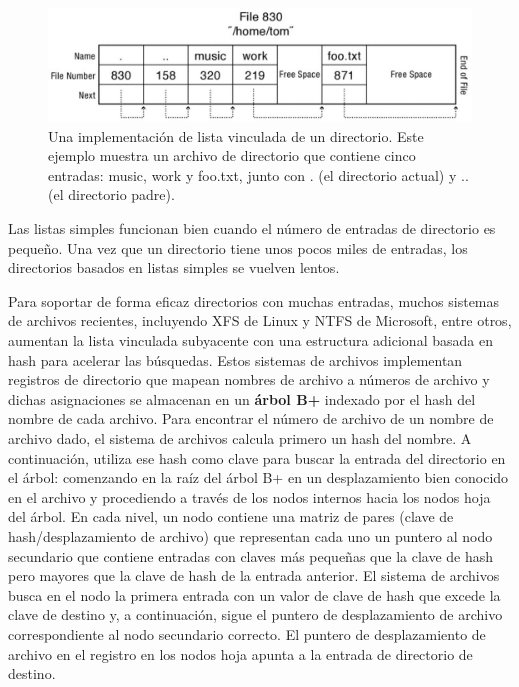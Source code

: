 \documentclass[10pt]{book}
\begin{document}
\begin{figure}[tbhp]
\centerline{\includegraphics[scale=0.50]{img/fig1304}}
\caption{Una implementación de lista vinculada de un directorio. Este ejemplo muestra un archivo de directorio que contiene cinco entradas: {\mf music}, {\mf work} y {\mf foo.txt}, junto con {\mf .} (el directorio actual) y {\mf ..} (el directorio padre).}
\label{fig1304}
\end{figure}

Las listas simples funcionan bien cuando el número de entradas de directorio es pequeño. Una vez que un directorio tiene unos pocos miles de entradas, los directorios basados en listas simples se vuelven lentos.

Para soportar de forma eficaz directorios con muchas entradas, muchos sistemas de archivos recientes, incluyendo XFS de Linux y NTFS de Microsoft, entre otros, aumentan la lista vinculada subyacente con una estructura adicional basada en hash para acelerar las búsquedas. Estos sistemas de archivos implementan registros de directorio que mapean nombres de archivo a números de archivo y dichas asignaciones se almacenan en un \textbf{árbol B+} indexado por el hash del nombre de cada archivo. Para encontrar el número de archivo de un nombre de archivo dado, el sistema de archivos calcula primero un hash del nombre. A continuación, utiliza ese hash como clave para buscar la entrada del directorio en el árbol: comenzando en la raíz del árbol B+ en un desplazamiento bien conocido en el archivo y procediendo a través de los nodos internos hacia los nodos hoja del árbol. En cada nivel, un nodo contiene una matriz de pares (clave de hash/desplazamiento de archivo) que representan cada uno un puntero al nodo secundario que contiene entradas con claves más pequeñas que la clave de hash pero mayores que la clave de hash de la entrada anterior. El sistema de archivos busca en el nodo la primera entrada con un valor de clave de hash que excede la clave de destino y, a continuación, sigue el puntero de desplazamiento de archivo correspondiente al nodo secundario correcto. El puntero de desplazamiento de archivo en el registro en los nodos hoja apunta a la entrada de directorio de destino.
\end{document}
